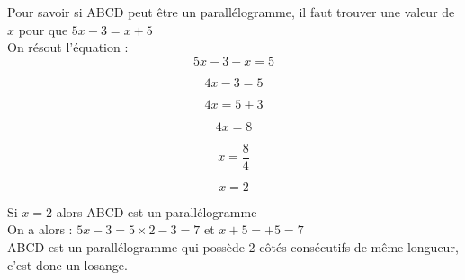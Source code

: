 \documentclass[a4paper,11pt]{article}
\begin{document}
 
 


\color{red}

Pour savoir si ABCD peut être un parallélogramme, il faut trouver une valeur de $x$ pour que $5x-3=x+5$\\

On résout l'équation :\\

$$ 5x-3-x=5 $$

$$ 4x-3=5 $$


$$ 4x=5 +3$$


$$ 4x=8$$


$$ x=\dfrac{8}{4}$$


$$ x=2$$

Si $x=2$ alors ABCD est un parallélogramme\\

On a alors : $5x-3 = 5 \times 2 - 3 = 7$ et $x+5 = +5 =7$\\

ABCD est un parallélogramme qui possède 2 côtés consécutifs de même longueur, c'est donc un losange.\\
\end{document}
